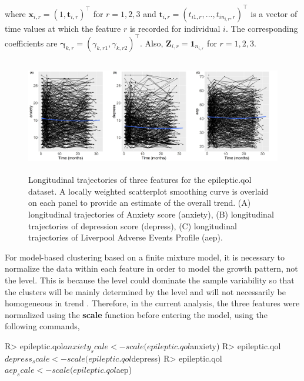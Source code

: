 where $ \boldsymbol{x}_{i,r} = (1,  \boldsymbol{t}_{i,r})^\top$ for $r=1,2,3$ and $\boldsymbol{t}_{i,r} = (t_{i1,r},...,t_{in_{i,r},r})^\top$ is a vector of time values at which the feature $r$ is recorded for individual $i$. The corresponding coefficients are $\boldsymbol{\gamma}_{k,r} =  (\gamma_{k,r1}, \gamma_{k,r2})^\top$. Also, $\boldsymbol{Z}_{i,r} =\boldsymbol{1}_{n_{i,r}}$ for $r=1,2,3$.
\begin{figure}[h]
\centering
\includegraphics[width=\textwidth,height=5cm]{./Figures/traj.JPEG}
\caption{\label{fig:traj_demo} Longitudinal trajectories of three features for the epileptic.qol dataset. A locally weighted scatterplot smoothing curve is overlaid on each panel to provide an estimate of the overall trend. (A) longitudinal trajectories of Anxiety score (anxiety), (B) longitudinal trajectories of depression score (depress), (C) longitudinal trajectories of Liverpool Adverse Events Profile (aep).}
\end{figure}
For model-based clustering based on a finite mixture model, it is necessary to normalize the data within each feature in order to model the growth pattern, not the level. This is because the level could dominate the sample variability so that the clusters will be mainly determined by the level and will not necessarily be homogeneous in trend \citep{Heggeseth2018}. Therefore, in the current analysis, the three features were normalized using the \textbf{scale} function before entering the model, using the following commands,
\begin{example}
R> epileptic.qol$anxiety_scale <- scale(epileptic.qol$anxiety)
R> epileptic.qol$depress_scale <- scale(epileptic.qol$depress)
R> epileptic.qol$aep_scale <- scale(epileptic.qol$aep)
\end{example}
